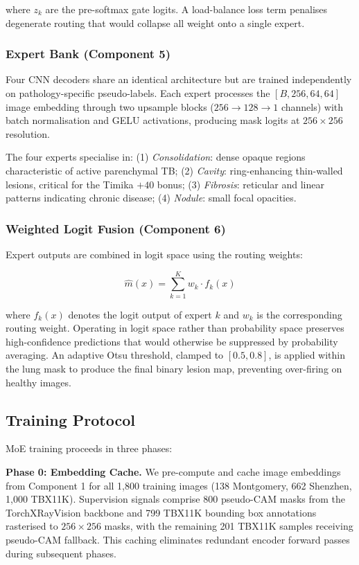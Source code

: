 \documentclass{article}
\begin{document}
where $z_k$ are the pre-softmax gate logits. A load-balance loss term penalises degenerate routing that would collapse all weight onto a single expert.

\subsubsection{Expert Bank (Component 5)}

Four CNN decoders share an identical architecture but are trained independently on pathology-specific pseudo-labels. Each expert processes the $[B, 256, 64, 64]$ image embedding through two upsample blocks ($256 \rightarrow 128 \rightarrow 1$ channels) with batch normalisation and GELU activations, producing mask logits at $256 \times 256$ resolution.

The four experts specialise in: (1) \textit{Consolidation}: dense opaque regions characteristic of active parenchymal TB; (2) \textit{Cavity}: ring-enhancing thin-walled lesions, critical for the Timika $+40$ bonus; (3) \textit{Fibrosis}: reticular and linear patterns indicating chronic disease; (4) \textit{Nodule}: small focal opacities.

\subsubsection{Weighted Logit Fusion (Component 6)}

Expert outputs are combined in logit space using the routing weights:

\begin{equation}
\hat{m}(x) = \sum_{k=1}^{K} w_k \cdot f_k(x)
\end{equation}

where $f_k(x)$ denotes the logit output of expert $k$ and $w_k$ is the corresponding routing weight. Operating in logit space rather than probability space preserves high-confidence predictions that would otherwise be suppressed by probability averaging. An adaptive Otsu threshold, clamped to $[0.5, 0.8]$, is applied within the lung mask to produce the final binary lesion map, preventing over-firing on healthy images.

\subsection{Training Protocol}

MoE training proceeds in three phases:

\textbf{Phase 0: Embedding Cache.} We pre-compute and cache image embeddings from Component 1 for all 1,800 training images (138 Montgomery, 662 Shenzhen, 1,000 TBX11K). Supervision signals comprise 800 pseudo-CAM masks from the TorchXRayVision backbone and 799 TBX11K bounding box annotations rasterised to $256 \times 256$ masks, with the remaining 201 TBX11K samples receiving pseudo-CAM fallback. This caching eliminates redundant encoder forward passes during subsequent phases.
\end{document}
